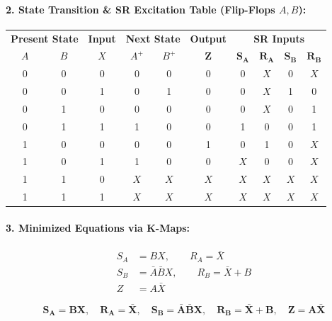 \documentclass[11pt,a4paper,oneside]{book}
\begin{document}
\paragraph{2. State Transition \& SR Excitation Table (Flip-Flops $A, B$):}
\begin{center}
\begin{tabular}{|cc|c|cc|c|cccc|}
\hline
\multicolumn{2}{|c|}{\textbf{Present State}} & \textbf{Input} & \multicolumn{2}{c|}{\textbf{Next State}} & \textbf{Output} & \multicolumn{4}{c|}{\textbf{SR Inputs}} \\
$A$ & $B$ & $X$ & $A^+$ & $B^+$ & $\mathbf{Z}$ & $\mathbf{S_A}$ & $\mathbf{R_A}$ & $\mathbf{S_B}$ & $\mathbf{R_B}$ \\ \hline
0 & 0 & 0 & 0 & 0 & 0 & 0 & $X$ & 0 & $X$ \\ \hline
0 & 0 & 1 & 0 & 1 & 0 & 0 & $X$ & 1 & 0 \\ \hline
0 & 1 & 0 & 0 & 0 & 0 & 0 & $X$ & 0 & 1 \\ \hline
0 & 1 & 1 & 1 & 0 & 0 & 1 & 0 & 0 & 1 \\ \hline
1 & 0 & 0 & 0 & 0 & 1 & 0 & 1 & 0 & $X$ \\ \hline
1 & 0 & 1 & 1 & 0 & 0 & $X$ & 0 & 0 & $X$ \\ \hline
1 & 1 & 0 & $X$ & $X$ & $X$ & $X$ & $X$ & $X$ & $X$ \\ \hline
1 & 1 & 1 & $X$ & $X$ & $X$ & $X$ & $X$ & $X$ & $X$ \\ \hline
\end{tabular}
\end{center}

\paragraph{3. Minimized Equations via K-Maps:}
\begin{align*}
S_A &= BX, \qquad R_A = \bar{X} \\
S_B &= \bar{A}\bar{B}X, \qquad R_B = \bar{X} + B \\
Z &= A\bar{X}
\end{align*}

\begin{answerbox}
$$\mathbf{S_A = BX, \quad R_A = \bar{X}, \quad S_B = \bar{A}\bar{B}X, \quad R_B = \bar{X} + B, \quad Z = A\bar{X}}$$
\end{answerbox}

\vspace{0.6cm}

\end{document}
